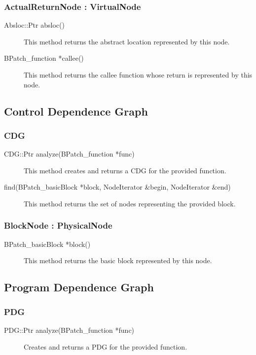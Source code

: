 \documentclass[12pt]{article}
\begin{document}
\subsubsection{ActualReturnNode : VirtualNode}
\begin{description}
\item[Absloc::Ptr absloc()]
This method returns the abstract location represented by this node.
\item[BPatch\_function *callee() ]
This method returns the callee function whose return is represented by this node.
\end{description}

\subsection{Control Dependence Graph}
\subsubsection{CDG}
\begin{description}
\item[CDG::Ptr analyze(BPatch\_function *func)]
This method creates and returns a CDG for the provided function.
\item[find(BPatch\_basicBlock *block, NodeIterator \&begin, NodeIterator \&end)]
This method returns the set of nodes representing the provided block.
\end{description}

\subsubsection{BlockNode : PhysicalNode}
\begin{description}
\item[BPatch\_basicBlock *block() ]
This method returns the basic block represented by this node. 
\end{description}

\subsection{Program Dependence Graph}
\subsubsection{PDG}
\begin{description}
\item[PDG::Ptr analyze(BPatch\_function *func)]
Creates and returns a PDG for the provided function.
\end{description}
\end{document}
